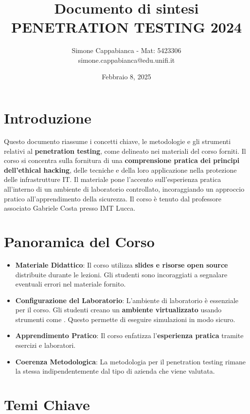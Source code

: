 \documentclass[12pt]{article}
\title{Documento di sintesi PENETRATION TESTING 2024}
\author{Simone Cappabianca - Mat: 5423306 \\  simone.cappabianca@edu.unifi.it}
\date{Febbraio 8, 2025}
\begin{document}
\maketitle
\newpage

\tableofcontents
\newpage


\section{Introduzione}

Questo documento riassume i concetti chiave, le metodologie e gli strumenti 
relativi al \textbf{penetration testing}, come delineato nei materiali del corso 
forniti. Il corso si concentra sulla fornitura di una \textbf{comprensione pratica 
dei principi dell'ethical hacking}, delle tecniche e della loro applicazione 
nella protezione delle infrastrutture IT. Il materiale pone l'accento 
sull'esperienza pratica all'interno di un ambiente di laboratorio controllato, 
incoraggiando un approccio pratico all'apprendimento della sicurezza. Il corso 
\`{e} tenuto dal professore associato Gabriele Costa presso IMT Lucca.

\section{Panoramica del Corso}
\begin{itemize}
    \item \textbf{Materiale Didattico}: Il corso utilizza \textbf{slides e 
    risorse open source} distribuite durante le lezioni. Gli studenti sono 
    incoraggiati a segnalare eventuali errori nel materiale fornito.
    \item \textbf{Configurazione del Laboratorio}: L'ambiente di laboratorio 
    \`{e} essenziale per il corso. Gli studenti creano un \textbf{ambiente 
    virtualizzato} usando strumenti come . 
    Questo permette di eseguire simulazioni in modo sicuro.
    \item \textbf{Apprendimento Pratico}: Il corso enfatizza l'\textbf{esperienza 
    pratica} tramite esercizi e laboratori.
    \item \textbf{Coerenza Metodologica}: La metodologia per il penetration 
    testing rimane la stessa indipendentemente dal tipo di azienda che viene 
    valutata. 
\end{itemize}

\section{Temi Chiave}
\end{document}
